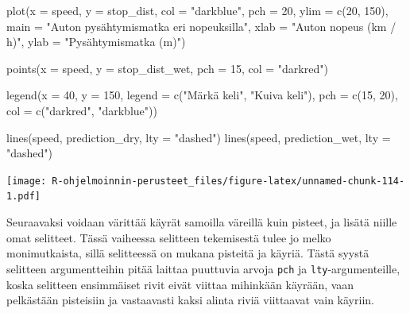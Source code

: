 \documentclass[
]{book}
\newenvironment{Shaded}{\begin{snugshade}}{\end{snugshade}}
\newcommand{\AttributeTok}[1]{\textcolor[rgb]{0.77,0.63,0.00}{#1}}
\newcommand{\DecValTok}[1]{\textcolor[rgb]{0.00,0.00,0.81}{#1}}
\newcommand{\FunctionTok}[1]{\textcolor[rgb]{0.00,0.00,0.00}{#1}}
\newcommand{\NormalTok}[1]{#1}
\newcommand{\StringTok}[1]{\textcolor[rgb]{0.31,0.60,0.02}{#1}}
\begin{document}
\begin{Shaded}
\begin{Highlighting}[]
\FunctionTok{plot}\NormalTok{(}\AttributeTok{x =}\NormalTok{ speed, }\AttributeTok{y =}\NormalTok{ stop\_dist,}
     \AttributeTok{col =} \StringTok{"darkblue"}\NormalTok{, }\AttributeTok{pch =} \DecValTok{20}\NormalTok{,}
     \AttributeTok{ylim =} \FunctionTok{c}\NormalTok{(}\DecValTok{20}\NormalTok{, }\DecValTok{150}\NormalTok{),}
     \AttributeTok{main =} \StringTok{"Auton pysähtymismatka eri nopeuksilla"}\NormalTok{,}
     \AttributeTok{xlab =} \StringTok{"Auton nopeus (km / h)"}\NormalTok{, }\AttributeTok{ylab =} \StringTok{"Pysähtymismatka (m)"}\NormalTok{)}

\FunctionTok{points}\NormalTok{(}\AttributeTok{x =}\NormalTok{ speed, }\AttributeTok{y =}\NormalTok{ stop\_dist\_wet, }\AttributeTok{pch =} \DecValTok{15}\NormalTok{, }\AttributeTok{col =} \StringTok{"darkred"}\NormalTok{)}

\FunctionTok{legend}\NormalTok{(}\AttributeTok{x =} \DecValTok{40}\NormalTok{, }\AttributeTok{y =} \DecValTok{150}\NormalTok{,}
       \AttributeTok{legend =} \FunctionTok{c}\NormalTok{(}\StringTok{"Märkä keli"}\NormalTok{, }\StringTok{"Kuiva keli"}\NormalTok{),}
       \AttributeTok{pch =} \FunctionTok{c}\NormalTok{(}\DecValTok{15}\NormalTok{, }\DecValTok{20}\NormalTok{), }\AttributeTok{col =} \FunctionTok{c}\NormalTok{(}\StringTok{"darkred"}\NormalTok{, }\StringTok{"darkblue"}\NormalTok{))}

\FunctionTok{lines}\NormalTok{(speed, prediction\_dry, }\AttributeTok{lty =} \StringTok{"dashed"}\NormalTok{)}
\FunctionTok{lines}\NormalTok{(speed, prediction\_wet, }\AttributeTok{lty =} \StringTok{"dashed"}\NormalTok{)}
\end{Highlighting}
\end{Shaded}

\texttt{[image: R-ohjelmoinnin-perusteet\_files/figure-latex/unnamed-chunk-114-1.pdf]}

Seuraavaksi voidaan värittää käyrät samoilla väreillä kuin pisteet, ja lisätä niille omat selitteet. Tässä vaiheessa selitteen tekemisestä tulee jo melko monimutkaista, sillä selitteessä on mukana pisteitä ja käyriä. Tästä syystä selitteen argumentteihin pitää laittaa puuttuvia arvoja \texttt{pch} ja \texttt{lty}-argumenteille, koska selitteen ensimmäiset rivit eivät viittaa mihinkään käyrään, vaan pelkästään pisteisiin ja vastaavasti kaksi alinta riviä viittaavat vain käyriin.
\end{document}
